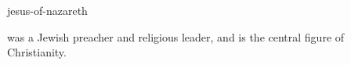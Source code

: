 \documentclass{stex}
\begin{document}
\begin{smodule}{jesus-of-nazareth}
\begin{sparagraph}[style=symdoc]
 was a Jewish preacher and religious leader, and is
the central figure of Christianity.
\end{sparagraph}
\end{smodule}
\end{document}
